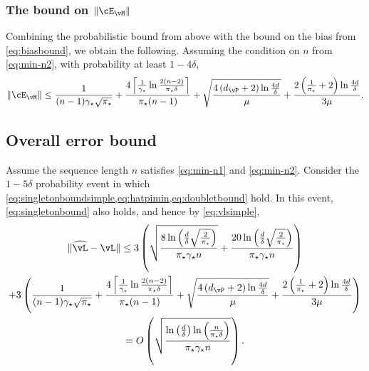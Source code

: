 \subsubsection{The bound on $\norm{\errm}$}
Combining the probabilistic bound from above with the bound on the
bias from \cref{eq:biasbound}, we obtain the following.
Assuming the condition on $n$ from \cref{eq:min-n2}, with probability
at least $1-4\delta$,
\begin{equation}
  \norm{\errm}
  \leq
  \frac{1}{(n-1)\gap\sqrt{\pimin}}
  +
  \frac{4
    \Ceil{
      \frac{1}{\gap}\ln\frac{2(n-2)}{\pimin\delta}
    }
  }{\pimin(n-1)}
  +
  \sqrt{
    \frac{4\Parens{ d_{\vP} + 2 } \ln\frac{4d}{\delta}}
    {\mu}
  }
  + \frac{2\Parens{ \frac1{\pimin} + 2 } \ln\frac{4d}{\delta}}
  {3\mu}
  .
  \label{eq:doubletbound}
\end{equation}

\subsection{Overall error bound}
Assume the sequence length $n$ satisfies \cref{eq:min-n1} and
\cref{eq:min-n2}.
Consider the $1-5\delta$ probability event in which
\cref{eq:singletonboundsimple,eq:hatpimin,eq:doubletbound} hold.
In this event, \cref{eq:singletonbound} also holds, and hence by
\cref{eq:vlsimple},
\begin{multline*}
  \norm{\wh\vL - \vL}
  \leq
  3
  \Parens{
    \sqrt{
      \frac{
        8\ln\Parens{\frac{d}\delta\sqrt{\frac{2}{\pimin}}}
      }{
        \pimin\gap n
      }
    }
    +
    \frac{
      20\ln\Parens{\frac{d}\delta\sqrt{\frac{2}{\pimin}}}
    }{
      \pimin\gap n
    }
  }
  \\
  +
  3\Parens{
    \frac{1}{(n-1)\gap\sqrt{\pimin}}
    +
    \frac{4
      \Ceil{
        \frac{1}{\gap}\ln\frac{2(n-2)}{\pimin\delta}
      }
    }{\pimin(n-1)}
    +
    \sqrt{
      \frac{4\Parens{ d_{\vP} + 2 } \ln\frac{4d}{\delta}}
      {\mu}
    }
    + \frac{2\Parens{ \frac1{\pimin} + 2 } \ln\frac{4d}{\delta}}
    {3\mu}
  }
  \\
  =
  O
  \Parens{
    \sqrt{
      \frac{
        \ln\Parens{\frac{d}{\delta}}
        \ln\Parens{\frac{n}{\pimin\delta}}
      }{\pimin\gap n}
    }
  }
  .
\end{multline*}


